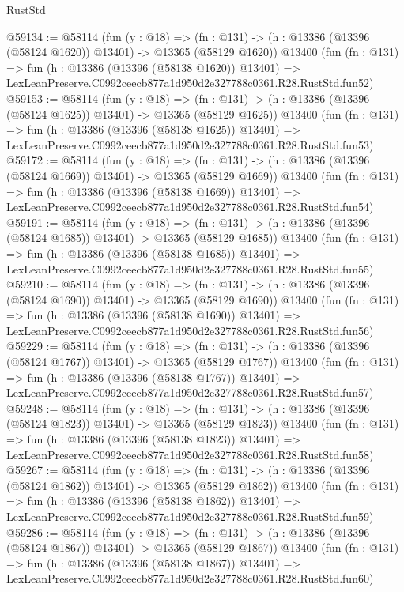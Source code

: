 \begin{lexlean}{RustStd}
\begin{coremodule}
@59134 := @58114
    (fun (y : @18) =>
    (fn : @131) -> (h : @13386 (@13396 (@58124 @1620)) @13401) -> @13365 (@58129 @1620))
    @13400
    (fun (fn : @131) =>
    fun (h : @13386 (@13396 (@58138 @1620)) @13401) =>
    LexLeanPreserve.C0992ceecb877a1d950d2e327788c0361.R28.RustStd.fun52)
@59153 := @58114
    (fun (y : @18) =>
    (fn : @131) -> (h : @13386 (@13396 (@58124 @1625)) @13401) -> @13365 (@58129 @1625))
    @13400
    (fun (fn : @131) =>
    fun (h : @13386 (@13396 (@58138 @1625)) @13401) =>
    LexLeanPreserve.C0992ceecb877a1d950d2e327788c0361.R28.RustStd.fun53)
@59172 := @58114
    (fun (y : @18) =>
    (fn : @131) -> (h : @13386 (@13396 (@58124 @1669)) @13401) -> @13365 (@58129 @1669))
    @13400
    (fun (fn : @131) =>
    fun (h : @13386 (@13396 (@58138 @1669)) @13401) =>
    LexLeanPreserve.C0992ceecb877a1d950d2e327788c0361.R28.RustStd.fun54)
@59191 := @58114
    (fun (y : @18) =>
    (fn : @131) -> (h : @13386 (@13396 (@58124 @1685)) @13401) -> @13365 (@58129 @1685))
    @13400
    (fun (fn : @131) =>
    fun (h : @13386 (@13396 (@58138 @1685)) @13401) =>
    LexLeanPreserve.C0992ceecb877a1d950d2e327788c0361.R28.RustStd.fun55)
@59210 := @58114
    (fun (y : @18) =>
    (fn : @131) -> (h : @13386 (@13396 (@58124 @1690)) @13401) -> @13365 (@58129 @1690))
    @13400
    (fun (fn : @131) =>
    fun (h : @13386 (@13396 (@58138 @1690)) @13401) =>
    LexLeanPreserve.C0992ceecb877a1d950d2e327788c0361.R28.RustStd.fun56)
@59229 := @58114
    (fun (y : @18) =>
    (fn : @131) -> (h : @13386 (@13396 (@58124 @1767)) @13401) -> @13365 (@58129 @1767))
    @13400
    (fun (fn : @131) =>
    fun (h : @13386 (@13396 (@58138 @1767)) @13401) =>
    LexLeanPreserve.C0992ceecb877a1d950d2e327788c0361.R28.RustStd.fun57)
@59248 := @58114
    (fun (y : @18) =>
    (fn : @131) -> (h : @13386 (@13396 (@58124 @1823)) @13401) -> @13365 (@58129 @1823))
    @13400
    (fun (fn : @131) =>
    fun (h : @13386 (@13396 (@58138 @1823)) @13401) =>
    LexLeanPreserve.C0992ceecb877a1d950d2e327788c0361.R28.RustStd.fun58)
@59267 := @58114
    (fun (y : @18) =>
    (fn : @131) -> (h : @13386 (@13396 (@58124 @1862)) @13401) -> @13365 (@58129 @1862))
    @13400
    (fun (fn : @131) =>
    fun (h : @13386 (@13396 (@58138 @1862)) @13401) =>
    LexLeanPreserve.C0992ceecb877a1d950d2e327788c0361.R28.RustStd.fun59)
@59286 := @58114
    (fun (y : @18) =>
    (fn : @131) -> (h : @13386 (@13396 (@58124 @1867)) @13401) -> @13365 (@58129 @1867))
    @13400
    (fun (fn : @131) =>
    fun (h : @13386 (@13396 (@58138 @1867)) @13401) =>
    LexLeanPreserve.C0992ceecb877a1d950d2e327788c0361.R28.RustStd.fun60)

\end{coremodule}
\end{lexlean}
